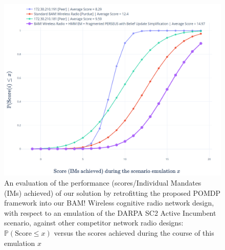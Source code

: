 \documentclass[12pt, draftcls, onecolumn]{IEEEtran}
\begin{document}
\begin{figure} [htb]
    \centerline{
    \includegraphics[width = 0.8\linewidth]{figures/DARPA_SC2_Active_Incumbent_Scores_CDF.png}}
    \caption{An evaluation of the performance (scores/Individual Mandates (IMs) achieved) of our solution by retrofitting the proposed POMDP framework into our BAM! Wireless cognitive radio network design, with respect to an emulation of the DARPA SC2 Active Incumbent scenario, against other competitor network radio designs: $\mathbb{P}(\text{Score}{\leq}x)$ versus the scores achieved during the course of this emulation $x$}
    \label{fig: Y. 4}
\end{figure}
\end{document}
